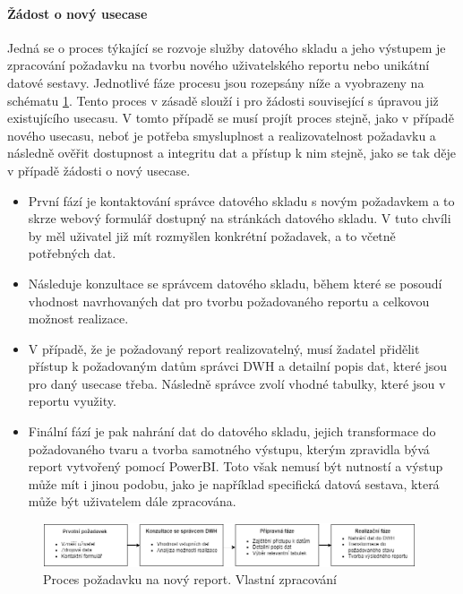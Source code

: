 \documentclass[
  digital,     %
  twoside,     %
  lof,         %
  lot,         %
]{fithesis4}
\begin{document}
\paragraph{Žádost o nový usecase} Jedná se o proces týkající se rozvoje služby datového skladu a jeho výstupem je zpracování požadavku na tvorbu nového uživatelského reportu nebo unikátní datové sestavy. Jednotlivé fáze procesu jsou rozepsány níže a vyobrazeny na schématu \ref{fig:new_report}. Tento proces v zásadě slouží i pro žádosti související s úpravou již existujícího usecasu. V tomto případě se musí projít proces stejně, jako v případě nového usecasu, neboť je potřeba smysluplnost a realizovatelnost požadavku a následně ověřit dostupnost a integritu dat a přístup k nim stejně, jako se tak děje v případě žádosti o nový usecase.
\begin{itemize}
    \item První fází je kontaktování správce datového skladu s novým požadavkem a to skrze webový formulář dostupný na stránkách datového skladu. V tuto chvíli by měl uživatel již mít rozmyšlen konkrétní požadavek, a to včetně potřebných dat. 
    \item Následuje konzultace se správcem datového skladu, během které se posoudí vhodnost navrhovaných dat pro tvorbu požadovaného reportu a celkovou možnost realizace.
    \item V případě, že je požadovaný report realizovatelný, musí žadatel přidělit přístup k požadovaným datům správci DWH a detailní popis dat, které jsou pro daný usecase třeba. Následně správce zvolí vhodné tabulky, které jsou v reportu využity.
    \item Finální fází je pak nahrání dat do datového skladu, jejich transformace do požadovaného tvaru a tvorba samotného výstupu, kterým zpravidla bývá report vytvořený pomocí PowerBI. Toto však nemusí být nutností a výstup může mít i jinou podobu, jako je například specifická datová sestava, která může být uživatelem dále zpracována. 
\end{itemize}
    \begin{figure}[t]
        \begin{center}
            \includegraphics[width=11cm]{img/new_usecase.png}
        \end{center}
        \caption{Proces požadavku na nový report. Vlastní zpracování}
        \label{fig:new_report}
    \end{figure} 
\end{document}
